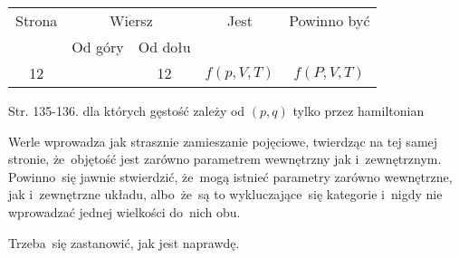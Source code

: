 \documentclass[a4paper,11pt]{article}
\begin{document}


\begin{center}

  \begin{tabular}{|c|c|c|c|c|}
    \hline
    Strona & \multicolumn{2}{c|}{Wiersz} & Jest
                              & Powinno być \\ \cline{2-3}
    & Od góry & Od dołu & & \\
    \hline
    12  & & 12 & $f( p, V, T )$ & $f( P, V, T )$ \\
    \hline
  \end{tabular}

\end{center}

\vspace{\spaceTwo}


Str. 135-136. dla których gęstość zależy od $( p, q )$ tylko przez hamiltonian \\













\vspace{0em}



\vspace{0em}


\noindent
{} Werle wprowadza jak strasznie zamieszanie pojęciowe,
twierdząc na tej samej stronie, że~objętość jest zarówno parametrem
wewnętrzny jak i~zewnętrznym. Powinno~się jawnie stwierdzić, że~mogą
istnieć parametry zarówno wewnętrzne, jak i~zewnętrzne układu,
albo~że~są to wykluczające~się kategorie i~nigdy nie wprowadzać
jednej wielkości do~nich obu.

Trzeba~się zastanowić, jak jest naprawdę. \Dok

\vspace{\spaceFour}





\noindent
{}
\end{document}

